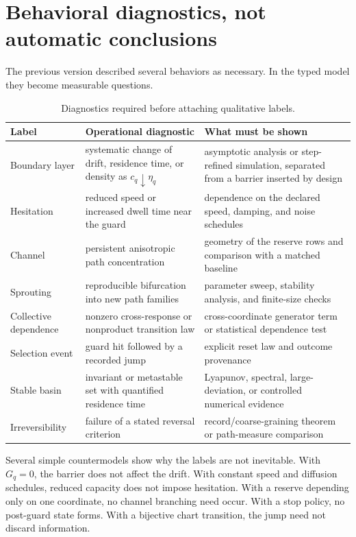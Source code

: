 \documentclass[11pt]{article}
\theoremstyle{definition}
\theoremstyle{remark}
\begin{document}
\section{Behavioral diagnostics, not automatic conclusions}
\label{sec:diagnostics}

The previous version described several behaviors as necessary.  In the
typed model they become measurable questions.

\begin{table}[ht]
\centering
\small
\begin{tabularx}{\textwidth}{L{0.20\textwidth}YY}
\toprule
Label & Operational diagnostic & What must be shown \\
\midrule
Boundary layer
  & systematic change of drift, residence time, or density as
    $c_q\downarrow\eta_q$
  & asymptotic analysis or step-refined simulation, separated from a
    barrier inserted by design \\
Hesitation
  & reduced speed or increased dwell time near the guard
  & dependence on the declared speed, damping, and noise schedules \\
Channel
  & persistent anisotropic path concentration
  & geometry of the reserve rows and comparison with a matched baseline \\
Sprouting
  & reproducible bifurcation into new path families
  & parameter sweep, stability analysis, and finite-size checks \\
Collective dependence
  & nonzero cross-response or nonproduct transition law
  & cross-coordinate generator term or statistical dependence test \\
Selection event
  & guard hit followed by a recorded jump
  & explicit reset law and outcome provenance \\
Stable basin
  & invariant or metastable set with quantified residence time
  & Lyapunov, spectral, large-deviation, or controlled numerical evidence \\
Irreversibility
  & failure of a stated reversal criterion
  & record/coarse-graining theorem or path-measure comparison \\
\bottomrule
\end{tabularx}
\caption{Diagnostics required before attaching qualitative labels.}
\label{tab:diagnostics}
\end{table}

Several simple countermodels show why the labels are not inevitable.
With $G_q=0$, the barrier does not affect the drift.  With constant speed
and diffusion schedules, reduced capacity does not impose hesitation.
With a reserve depending only on one coordinate, no channel branching need
occur.  With a stop policy, no post-guard state forms.  With a bijective
chart transition, the jump need not discard information.
\end{document}
